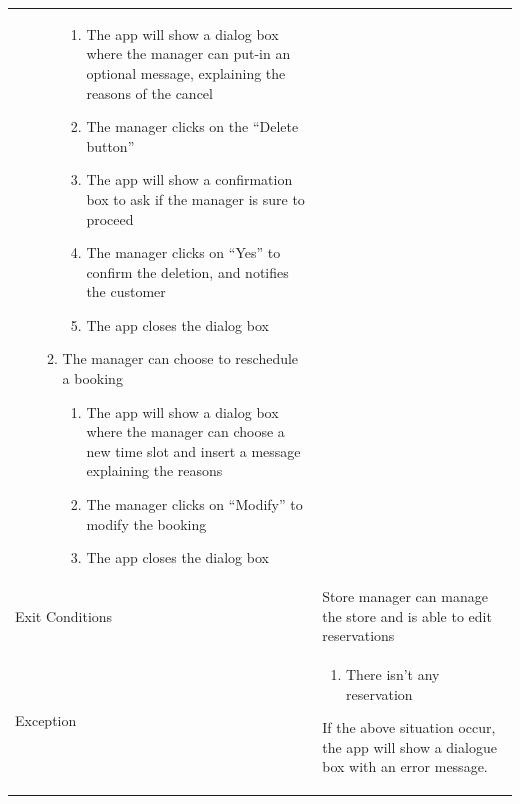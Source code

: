 \documentclass{article}
\newcommand\xrowht[2][0]
{\addstackgap[.5\dimexpr#2\relax]{\vphantom{#1}}}
\begin{document}
\begin{center}
\begin{adjustwidth}{-3cm}{}
\begin{tabular}[h!]{|m{7.5em}|m{36em}|}
\begin{enumerate}
\begin{enumerate}
\begin{enumerate}
										\item The app will show a dialog box where the manager can put-in an optional message, explaining the reasons of the cancel
										\item The manager clicks on the “Delete button”
										\item The app will show a confirmation box to ask if the manager is sure to proceed
										\item The manager clicks on “Yes” to confirm the deletion, and notifies the customer
										\item The app closes the dialog box
										
									\end{enumerate}
								
									\item The manager can choose to reschedule a booking
									
									\begin{enumerate}
										
										\item The app will show a dialog box where the manager can choose a new time slot and insert a message explaining the reasons
										\item The manager clicks on “Modify” to modify the booking
										\item The app closes the dialog box
										
									\end{enumerate}
									
								\end{enumerate}
								
							\end{enumerate}\\
							\xrowht{5pt}
							Exit Conditions & Store manager can manage the store and is able to edit reservations\\
							\xrowht{5pt}
							Exception & \begin{enumerate}
								
								\itemsep-0.25em
								\item There isn't any reservation
							\end{enumerate}
							If the above situation occur, the app will show a dialogue box with an error message. \\	
							\hline
							

\end{tabular}
\end{adjustwidth}
\end{center}
\end{document}
